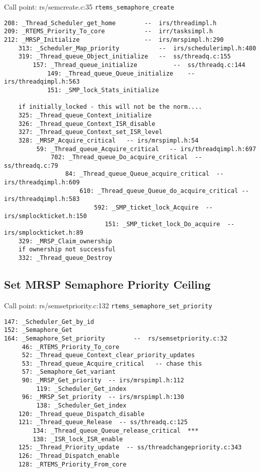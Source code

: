 Call point: rs/semcreate.c:35 \verb"rtems_semaphore_create"
\begin{verbatim}
208: _Thread_Scheduler_get_home        --  irs/threadimpl.h
209: _RTEMS_Priority_To_core           --  irr/tasksimpl.h
212: _MRSP_Initialize                  --  irs/mrspimpl.h:290
    313: _Scheduler_Map_priority           --  irs/schedulerimpl.h:480
    319: _Thread_queue_Object_initialize   --  ss/threadq.c:155
        157: _Thread_queue_initialize          --  ss/threadq.c:144
            149: _Thread_queue_Queue_initialize    --  irs/threadqimpl.h:563
            151: _SMP_lock_Stats_initialize

    if initially_locked - this will not be the norm....
    325: _Thread_queue_Context_initialize
    326: _Thread_queue_Context_ISR_disable
    327: _Thread_queue_Context_set_ISR_level
    328: _MRSP_Acquire_critical   -- irs/mrspimpl.h:54
         59: _Thread_queue_Acquire_critical   -- irs/threadqimpl.h:697
             702: _Thread_queue_Do_acquire_critical  -- ss/threadq.c:79
                 84: _Thread_queue_Queue_acquire_critical  -- irs/threadqimpl.h:609
                     610: _Thread_queue_Queue_do_acquire_critical -- irs/threadqimpl.h:583
                         592: _SMP_ticket_lock_Acquire  -- irs/smplockticket.h:150
                            151: _SMP_ticket_lock_Do_acquire  -- irs/smplockticket.h:89
    329: _MRSP_Claim_ownership
    if ownership not successful
    332: _Thread_queue_Destroy
\end{verbatim}

\newpage
\subsection{Set MRSP Semaphore Priority Ceiling}

Call point: rs/semsetpriority.c:132 \verb"rtems_semaphore_set_priority"
\begin{verbatim}
147: _Scheduler_Get_by_id
152: _Semaphore_Get
164: _Semaphore_Set_priority        --  rs/semsetpriority.c:32
     46: _RTEMS_Priority_To_core
     52: _Thread_queue_Context_clear_priority_updates
     53: _Thread_queue_Acquire_critical   -- chase this
     57: _Semaphore_Get_variant
     90: _MRSP_Get_priority  -- irs/mrspimpl.h:112
         119: _Scheduler_Get_index
     96: _MRSP_Set_priority  -- irs/mrspimpl.h:130
         138: _Scheduler_Get_index
    120: _Thread_queue_Dispatch_disable
    121: _Thread_queue_Release  -- ss/threadq.c:125
        134: _Thread_queue_Queue_release_critical  ***
        138: _ISR_lock_ISR_enable
    125: _Thread_Priority_update  -- ss/threadchangepriority.c:343
    126: _Thread_Dispatch_enable
    128: _RTEMS_Priority_From_core
\end{verbatim}

